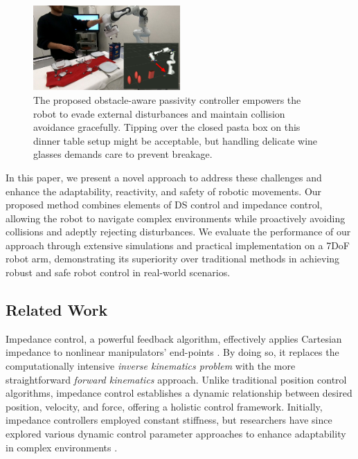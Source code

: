 \begin{figure}
\centerline{\includegraphics[width=0.5\textwidth]{figures/robot_arm_table_avoidance}}
\caption{
The proposed obstacle-aware passivity controller empowers the robot to evade external disturbances and maintain collision avoidance gracefully. 
Tipping over the closed pasta box on this dinner table setup might be acceptable, but handling delicate wine glasses demands care to prevent breakage.
}
\label{fig:table_avoidance_with_obstacle}
\end{figure}

In this paper, we present a novel approach to address these challenges and enhance the adaptability, reactivity, and safety of robotic movements. Our proposed method combines elements of DS control and impedance control, allowing the robot to navigate complex environments while proactively avoiding collisions and adeptly rejecting disturbances. We evaluate the performance of our approach through extensive simulations and practical implementation on a 7DoF robot arm, demonstrating its superiority over traditional methods in achieving robust and safe robot control in real-world scenarios.


\subsection{Related Work}
Impedance control, a powerful feedback algorithm, effectively applies Cartesian impedance to nonlinear manipulators' end-points \cite{takegaki1981new, hogan1985impedance}. By doing so, it replaces the computationally intensive \textit{inverse kinematics problem} with the more straightforward \textit{forward kinematics} approach. Unlike traditional position control algorithms, impedance control establishes a dynamic relationship between desired position, velocity, and force, offering a holistic control framework.
Initially, impedance controllers employed constant stiffness, but researchers have since explored various dynamic control parameter approaches to enhance adaptability in complex environments \cite{vanderborght2013variable, abu2020variable}.

